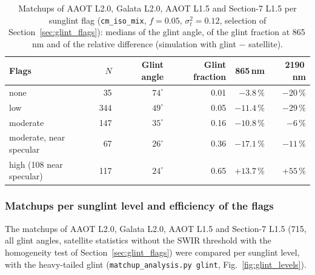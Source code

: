 \documentclass[11pt,a4paper]{article}
\newcommand{\code}[1]{\texttt{#1}}
\begin{document}
\begin{table}[h]
\centering\small
\caption{Matchups of AAOT L2.0, Galata L2.0, AAOT L1.5 and Section-7 L1.5 per sunglint flag (\code{cm\_iso\_mix},
$f=0.05$, $\sigma_t^2=0.12$, selection of Section~\ref{sec:glint_flags}): medians of the glint angle, of the glint
fraction at 865\,nm and of the relative difference (simulation with glint $-$ satellite).}
\label{tab:glint_flags}
\begin{tabular}{lrrrrr}
\toprule
Flags & $N$ & Glint angle & Glint fraction & 865\,nm & 2190\,nm \\
\midrule
none                            & 35  & $74^\circ$ & 0.01 & $-3.8\,\%$  & $-20\,\%$ \\
low                             & 344 & $49^\circ$ & 0.05 & $-11.4\,\%$ & $-29\,\%$ \\
moderate                        & 147 & $35^\circ$ & 0.16 & $-10.8\,\%$ & $-6\,\%$ \\
moderate, near specular         & 67  & $26^\circ$ & 0.36 & $-17.1\,\%$ & $-11\,\%$ \\
high (108 near specular)        & 117 & $24^\circ$ & 0.65 & $+13.7\,\%$ & $+55\,\%$ \\
\bottomrule
\end{tabular}
\end{table}

\subsubsection{Matchups per sunglint level and efficiency of the flags}
\label{sec:glint_levels}
The matchups of AAOT L2.0, Galata L2.0, AAOT L1.5 and Section-7 L1.5 (715, all glint angles, satellite statistics
without the SWIR threshold with the homogeneity test of Section~\ref{sec:glint_flags}) were compared per sunglint
level, with the heavy-tailed glint (\code{matchup\_analysis.py glint}, Fig.~\ref{fig:glint_levels}).
\end{document}
